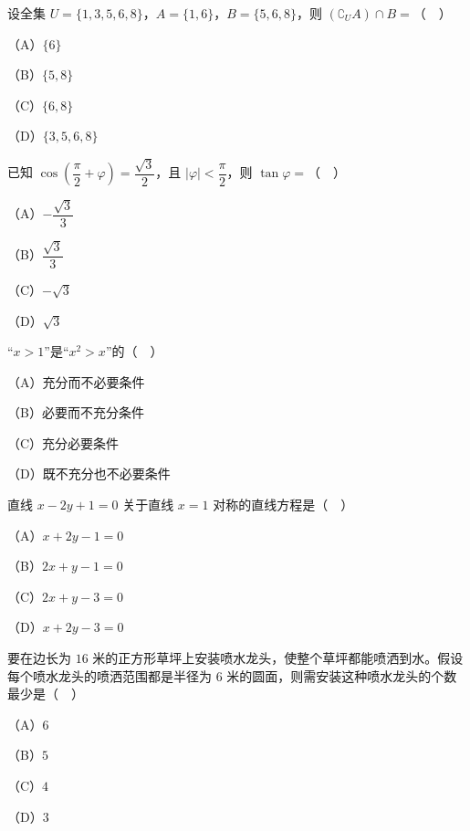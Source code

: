 


\begin{question}
设全集 $U=\{1,3,5,6,8\}$，$A=\{1,6\}$，$B=\{5,6,8\}$，则 $(\complement_UA)\cap B=$（　）

（A）$\{6\}$

（B）$\{5,8\}$

（C）$\{6,8\}$

（D）$\{3,5,6,8\}$

\end{question}
\begin{question}
已知 $\cos\left(\dfrac{\pi}{2}+\varphi\right)=\dfrac{\sqrt3}{2}$，且 $|\varphi|<\dfrac{\pi}{2}$，则 $\tan\varphi=$（　）

（A）$-\dfrac{\sqrt3}{3}$

（B）$\dfrac{\sqrt3}{3}$

（C）$-\sqrt3$

（D）$\sqrt3$

\end{question}
\begin{question}
“$x>1$”是“$x^2>x$”的（　）

（A）充分而不必要条件

（B）必要而不充分条件

（C）充分必要条件

（D）既不充分也不必要条件

\end{question}
\begin{question}
直线 $x-2y+1=0$ 关于直线 $x=1$ 对称的直线方程是（　）

（A）$x+2y-1=0$

（B）$2x+y-1=0$

（C）$2x+y-3=0$

（D）$x+2y-3=0$

\Needspace{0.4\textheight}
\end{question}
\begin{question}
要在边长为 $16$ 米的正方形草坪上安装喷水龙头，使整个草坪都能喷洒到水。假设每个喷水龙头的喷洒范围都是半径为 $6$ 米的圆面，则需安装这种喷水龙头的个数最少是（　）
\nopagebreak[4]
\begin{center}\end{center}
\nopagebreak[4]
（A）$6$

（B）$5$

（C）$4$

（D）$3$

\end{question}
